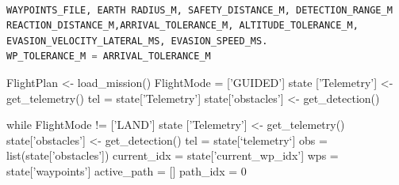 \documentclass[a4paper, 11pt]{article}
\begin{document}


\begin{lstlisting}[language=Python]

WAYPOINTS_FILE, EARTH RADIUS_M, SAFETY_DISTANCE_M, DETECTION_RANGE_M 
REACTION_DISTANCE_M,ARRIVAL_TOLERANCE_M, ALTITUDE_TOLERANCE_M, 
EVASION_VELOCITY_LATERAL_MS, EVASION_SPEED_MS.
WP_TOLERANCE_M = ARRIVAL_TOLERANCE_M

\end{lstlisting}


FlightPlan <- load_mission()
FlightMode = ['GUIDED']
state ['Telemetry'] <- get_telemetry() %
tel = state['Telemetry'] %
state['obstacles'] <- get_detection() %
        
while FlightMode != ['LAND']
    state ['Telemetry'] <- get_telemetry()
    state['obstacles'] <- get_detection()
    tel = state[`telemetry`]
    obs = list(state['obstacles'])
    current_idx = state['current_wp_idx']
    wps = state['waypoints'] %
    active_path = [] %
    path_idx = 0 %
\end{document}
